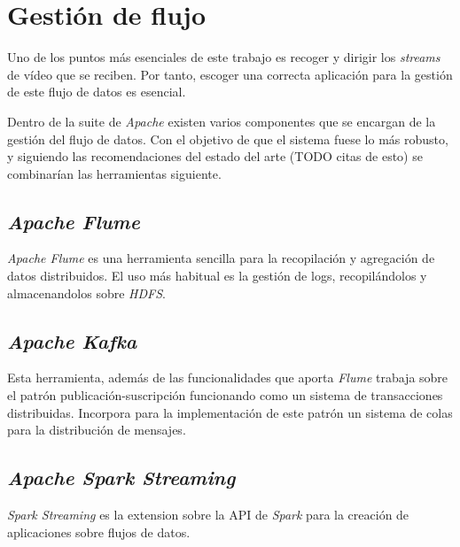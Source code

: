 
\section{Gestión de flujo}	

Uno de los puntos más esenciales de este trabajo es recoger y dirigir los \textit{streams} de vídeo que se reciben. Por tanto, escoger una correcta aplicación para la gestión de este flujo de datos es esencial.

Dentro de la suite de \textit{Apache} existen varios componentes que se encargan de la gestión del flujo de datos. Con el objetivo de que el sistema fuese lo más robusto, y siguiendo las recomendaciones del estado del arte (TODO citas de esto) se combinarían las herramientas siguiente.

\subsection{\textit{Apache Flume}}
\textit{Apache Flume} es una herramienta sencilla para la recopilación y agregación de datos distribuidos. El uso más habitual es la gestión de logs, recopilándolos y almacenandolos sobre \textit{HDFS}.

\subsection{\textit{Apache Kafka}}
Esta herramienta, además de las funcionalidades que aporta \textit{Flume} trabaja sobre el patrón publicación-suscripción funcionando como un sistema de transacciones distribuidas. Incorpora para la implementación de este patrón un sistema de colas para la distribución de mensajes.

\subsection{\textit{Apache Spark Streaming}}
\textit{Spark Streaming} es la extension sobre la API de \textit{Spark} para la creación de aplicaciones sobre flujos de datos. 
